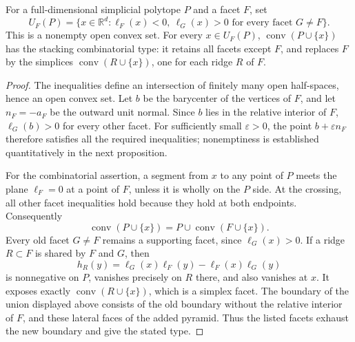 \begin{lemma}
For a full-dimensional simplicial polytope \(P\) and a facet \(F\), set
\[
 U_F(P)=\{x\in\mathbb R^d:\ell_F(x)<0,
                  \ \ell_G(x)>0\text{ for every facet }G\ne F\}.
\]
This is a nonempty open convex set. For every \(x\in U_F(P)\),
\(\operatorname{conv}(P\cup\{x\})\) has the stacking combinatorial type:
it retains all facets except \(F\), and replaces \(F\) by the simplices
\(\operatorname{conv}(R\cup\{x\})\), one for each ridge \(R\) of \(F\).
\end{lemma}
\begin{proof}
The inequalities define an intersection of finitely many open half-spaces,
hence an open convex set. Let \(b\) be the barycenter of the vertices of
\(F\), and let \(n_F=-a_F\) be the outward unit normal. Since \(b\) lies in
the relative interior of \(F\), \(\ell_G(b)>0\) for every other facet.
For sufficiently small \(\varepsilon>0\), the point
\(b+\varepsilon n_F\) therefore satisfies all the required inequalities;
nonemptiness is established quantitatively in the next proposition.

For the combinatorial assertion, a segment from \(x\) to any point of \(P\)
meets the plane \(\ell_F=0\) at a point of \(F\), unless it is wholly on the
\(P\) side. At the crossing, all other facet inequalities hold because they
hold at both endpoints. Consequently
\[
 \operatorname{conv}(P\cup\{x\})
       =P\cup\operatorname{conv}(F\cup\{x\}).
\]
Every old facet \(G\ne F\) remains a supporting facet, since
\(\ell_G(x)>0\). If a ridge \(R\subset F\) is shared by \(F\) and \(G\),
then
\[
 h_R(y)=\ell_G(x)\ell_F(y)-\ell_F(x)\ell_G(y)
\]
is nonnegative on \(P\), vanishes precisely on \(R\) there, and also
vanishes at \(x\). It exposes exactly
\(\operatorname{conv}(R\cup\{x\})\), which is a simplex facet. The boundary
of the union displayed above consists of the old boundary without the
relative interior of \(F\), and these lateral faces of the added pyramid.
Thus the listed facets exhaust the new boundary and give the stated type.
\end{proof}

